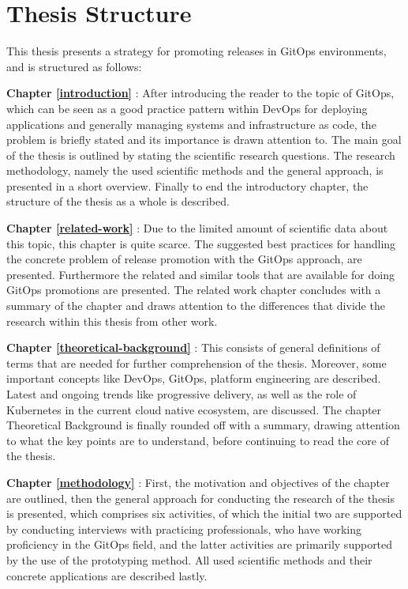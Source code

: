\section{Thesis Structure}
\label{introduction:thesis-structure}


This thesis presents a strategy for promoting releases in GitOps environments,
and is structured as follows:

\textbf{Chapter \ref{introduction} }:
After introducing the reader to the topic of GitOps, which can be seen as a good practice pattern within DevOps for deploying applications and generally managing systems and infrastructure as code,
the problem is briefly stated and its importance is drawn attention to.
The main goal of the thesis is outlined by stating the scientific research questions.
The research methodology, namely the used scientific methods and the general approach, is presented in a short overview.
Finally to end the introductory chapter, the structure of the thesis as a whole is described.

\textbf{Chapter \ref{related-work} }:
Due to the limited amount of scientific data about this topic, this chapter is quite scarce.
The suggested best practices for handling the concrete problem of release promotion with the GitOps approach,
are presented.
Furthermore the related and similar tools that are available for doing GitOps promotions are presented.
The related work chapter concludes with a summary of the chapter and draws attention to the differences
that divide the research within this thesis from other work.

\textbf{Chapter \ref{theoretical-background} }:
This consists of general definitions of terms that are needed for further comprehension of the thesis.
Moreover, some important concepts like DevOps, GitOps, platform engineering are described.
Latest and ongoing trends like progressive delivery, as well as
the role of Kubernetes in the current cloud native ecosystem,
are discussed.
The chapter Theoretical Background is finally rounded off with a summary,
drawing attention to what the key points are to understand,
before continuing to read the core of the thesis.

\textbf{Chapter \ref{methodology} }:
First, the motivation and objectives of the chapter are outlined,
then the general approach for conducting the research of the thesis is presented,
which comprises six activities, of which the initial two are supported by conducting interviews
with practicing professionals, who have working proficiency in the GitOps field,
and the latter activities are primarily supported by the use of the prototyping method.
All used scientific methods and their concrete applications are described lastly.

